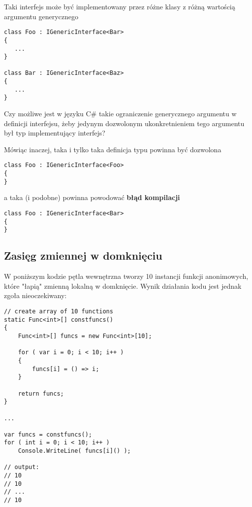 Taki interfejs może być implementowany przez różne klasy z różną wartością argumentu generycznego

\begin{scriptsize}
\begin{verbatim}
class Foo : IGenericInterface<Bar>
{
   ...
}
  
class Bar : IGenericInterface<Baz>
{
   ...
}
\end{verbatim}
\end{scriptsize}

Czy możliwe jest w języku C\# takie ograniczenie generycznego argumentu w definicji interfejsu, żeby jedynym dozwolonym ukonkretnieniem tego argumentu był typ implementujący interfejs?

Mówiąc inaczej, taka i tylko taka definicja typu powinna być dozwolona

\begin{scriptsize}
\begin{verbatim}
class Foo : IGenericInterface<Foo>
{
}
\end{verbatim}
\end{scriptsize}

a taka (i podobne) powinna powodować {\bf błąd kompilacji}

\begin{scriptsize}
\begin{verbatim}
class Foo : IGenericInterface<Bar>
{
}
\end{verbatim}
\end{scriptsize}

\subsection{Zasięg zmiennej w domknięciu}

W poniższym kodzie pętla wewnętrzna tworzy 10 instancji funkcji anonimowych, które "łapią" zmienną lokalną w domknięcie. Wynik działania kodu jest jednak zgoła nieoczekiwany:


\begin{scriptsize}
\begin{verbatim}
// create array of 10 functions
static Func<int>[] constfuncs()
{
    Func<int>[] funcs = new Func<int>[10];
 
    for ( var i = 0; i < 10; i++ )
    {
        funcs[i] = () => i;
    }
 
    return funcs;
}
 
...
 
var funcs = constfuncs();
for ( int i = 0; i < 10; i++ )
    Console.WriteLine( funcs[i]() );
 
// output:
// 10
// 10
// ...
// 10
\end{verbatim}
\end{scriptsize}

